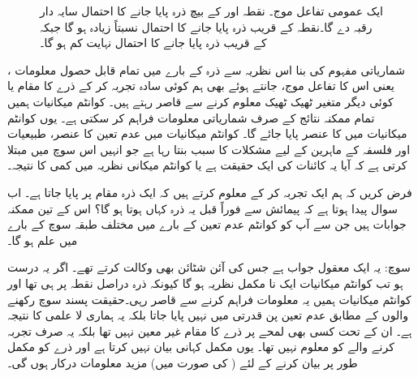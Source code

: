 \begin{figure}
\centering
{}
\caption{
ایک عمومی تفاعل موج۔ نقطہ  اور  کے بیچ ذرہ پایا جانے کا احتمال سایہ دار رقبہ دے گا۔نقطہ  کے قریب ذرہ پایا جانے کا احتمال نسبتاً زیادہ ہو گا جبکہ  کے قریب ذرہ پایا جانے کا احتمال نہایت کم ہو گا۔
}
\label{شکل_تفاعل_موج_احتمال_اور_رقبہ}
\end{figure}
شماریاتی مفہوم کی بنا اس نظریہ سے  ذرہ کے بارے میں تمام قابل حصول معلومات ، یعنی اس کا تفاعل موج، جانتے ہوئے بھی ہم  کوئی سادہ تجربہ کر کے ذرے کا مقام یا کوئی دیگر متغیر ٹھیک ٹھیک معلوم کرنے سے قاصر رہتے ہیں۔ کوانٹم میکانیات ہمیں تمام ممکنہ نتائج کے صرف شماریاتی معلومات فراہم کر سکتی ہے۔ یوں  کوانٹم میکانیات میں  کا عنصر پایا جائے گا۔ کوانٹم میکانیات میں عدم تعین کا عنصر،   طبیعیات اور فلسفہ کے ماہرین کے لیے مشکلات کا سبب بنتا رہا ہے جو انہیں اس سوچ   میں مبتلا کرتی  ہے  کہ آیا یہ کائنات کی ایک حقیقت ہے یا کوانٹم میکانی نظریہ میں کمی کا نتیجہ۔

 فرض کریں کہ ہم ایک تجربہ کر کے  معلوم کرتے ہیں کہ ایک ذرہ مقام  پر پایا جاتا ہے۔ اب سوال پیدا ہوتا ہے کہ پیمائش سے فوراً قبل یہ ذرہ کہاں ہوتا ہو گا؟ اس کے تین ممکنہ  جوابات ہیں جن سے آپ کو کوانٹم عدم تعین کے بارے میں مختلف طبقہ سوچ کے بارے میں علم ہو گا۔ 

\quad {}
 سوچ:    یہ ایک معقول جواب ہے جس کی آئن شٹائن بھی وکالت کرتے تھے۔ اگر یہ درست ہو تب کوانٹم میکانیات ایک نا مکمل نظریہ ہو گا کیونکہ ذرہ دراصل نقطہ  پر ہی تھا اور کوانٹم میکانیات ہمیں یہ معلومات فراہم کرنے سے قاصر رہی۔حقیقت پسند سوچ رکھنے  والوں کے مطابق عدم تعین پن قدرتی میں نہیں پایا جاتا بلکہ  یہ ہماری لا علمی کا نتیجہ ہے۔ ان کے تحت کسی بھی لمحے پر ذرے کا مقام غیر معین نہیں تھا بلکہ یہ صرف تجربہ کرنے والے کو معلوم نہیں تھا۔ یوں  مکمل کہانی بیان نہیں کرتا ہے اور ذرے کو مکمل طور پر بیان کرنے کے لئے ( کی صورت میں) مزید معلومات درکار ہوں گی۔

